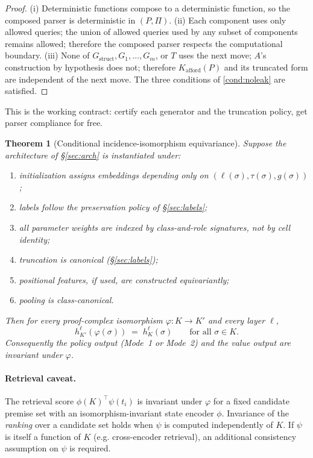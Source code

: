 \documentclass[11pt]{article}
\theoremstyle{definition}
\theoremstyle{plain}
\newtheorem{theorem}[definition]{Theorem}
\newcommand{\Kafford}{K_{\mathrm{afford}}}
\begin{document}
\begin{proof}
(i) Deterministic functions compose to a deterministic function, so the composed parser is deterministic in $(P, \Pi)$. (ii) Each component uses only allowed queries; the union of allowed queries used by any subset of components remains allowed; therefore the composed parser respects the computational boundary. (iii) None of $G_{\mathrm{struct}}, G_1, \ldots, G_m$, or $T$ uses the next move; $A$'s construction by hypothesis does not; therefore $\Kafford(P)$ and its truncated form are independent of the next move. The three conditions of \ref{cond:noleak} are satisfied.
\end{proof}

This is the working contract: certify each generator and the truncation policy, get parser compliance for free.

\begin{theorem}[Conditional incidence-isomorphism equivariance]\label{thm:equiv}
Suppose the architecture of \S\ref{sec:arch} is instantiated under:
\begin{enumerate}[label=(\roman*)]
\item initialization assigns embeddings depending only on $(\ell(\sigma), \tau(\sigma), g(\sigma))$;
\item labels follow the preservation policy of \S\ref{sec:labels};
\item all parameter weights are indexed by class-and-role signatures, not by cell identity;
\item truncation is canonical (\S\ref{sec:labels});
\item positional features, if used, are constructed equivariantly;
\item pooling is class-canonical.
\end{enumerate}
Then for every proof-complex isomorphism $\varphi\colon K \to K'$ and every layer $\ell$,
\[
h^\ell_{K'}(\varphi(\sigma)) \;=\; h^\ell_{K}(\sigma) \qquad \text{for all } \sigma \in K.
\]
Consequently the policy output (Mode~1 or Mode~2) and the value output are invariant under $\varphi$.
\end{theorem}

\paragraph{Retrieval caveat.} The retrieval score $\phi(K)^\top \psi(t_i)$ is invariant under $\varphi$ for a fixed candidate premise set with an isomorphism-invariant state encoder $\phi$. Invariance of the \emph{ranking} over a candidate set holds when $\psi$ is computed independently of $K$. If $\psi$ is itself a function of $K$ (e.g. cross-encoder retrieval), an additional consistency assumption on $\psi$ is required.
\end{document}
